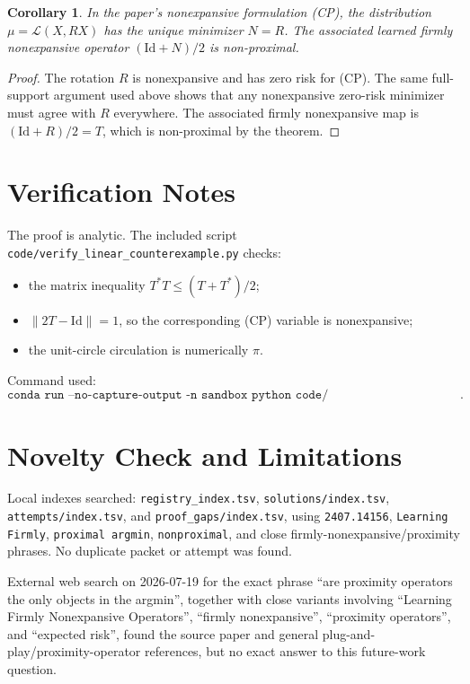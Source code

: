 \documentclass[11pt]{article}
\newtheorem{corollary}{Corollary}
\newcommand{\Id}{\mathrm{Id}}
\begin{document}
\begin{corollary}
In the paper's nonexpansive formulation (CP), the distribution $\mu=\mathcal
L(X,RX)$ has the unique minimizer $N=R$.  The associated learned firmly
nonexpansive operator $(\Id+N)/2$ is non-proximal.
\end{corollary}

\begin{proof}
The rotation $R$ is nonexpansive and has zero risk for (CP).  The same
full-support argument used above shows that any nonexpansive zero-risk minimizer
must agree with $R$ everywhere.  The associated firmly nonexpansive map is
$(\Id+R)/2=T$, which is non-proximal by the theorem.
\end{proof}

\section*{Verification Notes}

The proof is analytic.  The included script
\texttt{code/verify\_linear\_counterexample.py} checks:
\begin{itemize}
    \item the matrix inequality $T^*T\leq (T+T^*)/2$;
    \item $\|2T-\Id\|=1$, so the corresponding (CP) variable is nonexpansive;
    \item the unit-circle circulation is numerically $\pi$.
\end{itemize}

Command used:
\[
\texttt{conda run --no-capture-output -n sandbox python code/verify\_linear\_counterexample.py}.
\]

\section*{Novelty Check and Limitations}

Local indexes searched: \texttt{registry\_index.tsv}, \texttt{solutions/index.tsv},
\texttt{attempts/index.tsv}, and \texttt{proof\_gaps/index.tsv}, using
\texttt{2407.14156}, \texttt{Learning Firmly}, \texttt{proximal argmin},
\texttt{nonproximal}, and close firmly-nonexpansive/proximity phrases.  No
duplicate packet or attempt was found.

External web search on 2026-07-19 for the exact phrase ``are proximity
operators the only objects in the argmin'', together with close variants
involving ``Learning Firmly Nonexpansive Operators'', ``firmly nonexpansive'',
``proximity operators'', and ``expected risk'', found the source paper and
general plug-and-play/proximity-operator references, but no exact answer to this
future-work question.
\end{document}
